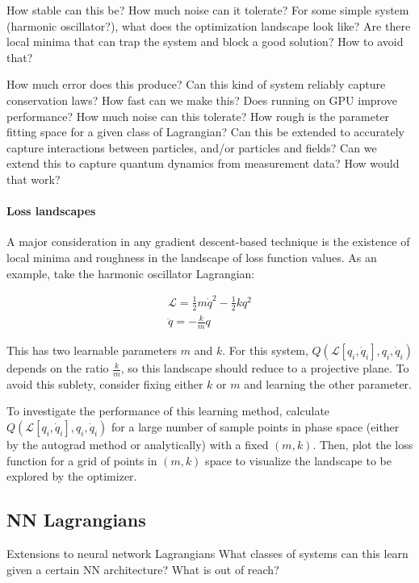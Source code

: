 \documentclass[]{article}
\begin{document}
How stable can this be? How much noise can it tolerate?
For some simple system (harmonic oscillator?), what does the optimization landscape look like?
Are there local minima that can trap the system and block a good solution? How to avoid that?

How much error does this produce? Can this kind of system reliably capture conservation laws? 
How fast can we make this? Does running on GPU improve performance? 
How much noise can this tolerate? How rough is the parameter fitting space for a given class of Lagrangian?
Can this be extended to accurately capture interactions between particles, and/or particles and fields?
Can we extend this to capture quantum dynamics from measurement data? How would that work?
\cite{DiracLagrangianinQM}

\paragraph{Loss landscapes}

A major consideration in any gradient descent-based technique is the existence of local minima and roughness in the landscape of loss function values. As an example, take the harmonic oscillator Lagrangian\cite{Taylor}:

\begin{eqnarray}
	\mathcal{L} = \frac{1}{2}m \dot{q}^2 - \frac{1}{2}k q^2 \\ 
	\ddot{q} = -\frac{k}{m} q
\end{eqnarray}

This has two learnable parameters $m$ and $k$. For this system, $Q(\mathcal{L}[q_i,\dot{q}_i],q_i,\dot{q}_i)$ depends on the ratio $\frac{k}{m}$, so this landscape should reduce to a projective plane. To avoid this sublety, consider fixing either $k$ or $m$ and learning the other parameter.

To investigate the performance of this learning method, calculate $Q(\mathcal{L}[q_i,\dot{q}_i],q_i,\dot{q}_i)$ for a large number of sample points in phase space (either by the autograd method or analytically) with a fixed $(m,k)$. Then, plot the loss function for a grid of points in $(m,k)$ space to visualize the landscape to be explored by the optimizer.




\subsection{NN Lagrangians}
Extensions to neural network Lagrangians
What classes of systems can this learn given a certain NN architecture? What is out of reach?
\end{document}
